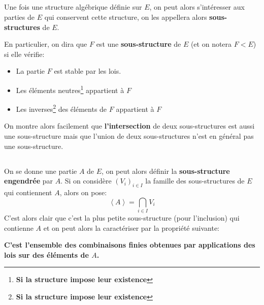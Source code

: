 \subsection*{}
Une fois une structure algébrique définie sur \(E\), on peut alors s'intéresser aux parties de \(E\) qui conservent cette structure, on les appellera alors \textbf{sous-structures} de \(E\).\<

En particulier, on dira que \(F\) est une \textbf{sous-structure} de \(E\) (et on notera \(F < E\)) si elle vérifie:
\begin{itemize}
   \item La partie \(F\) est stable par les lois.
   \item Les éléments neutres\footnote[1]{\textbf{Si la structure impose leur existence}} appartient à \(F\) 
   \item Les inverses\footnote[2]{\textbf{Si la structure impose leur existence}} des éléments de \(F\) appartient à \(F\)
\end{itemize}
On montre alors facilement que \textbf{l'intersection} de deux sous-structures est aussi une sous-structure mais que l'union de deux sous-structures n'est en général pas une sous-structure.
\subsection*{}
On se donne une partie \( A \) de \( E \), on peut alors définir la \textbf{sous-structure engendrée} par \( A \). Si on considère \( (V_i)_{i \in I} \) la famille des sous-structures de \( E \) qui contiennent \( A \), alors on pose:
\[ 
   \left\langle A \right\rangle = \bigcap_{i \in I} V_i
\]
C'est alors clair que c'est la plus petite sous-structure (pour l'inclusion) qui contienne \( A \) et on peut alors la caractériser par la propriété suivante:
\begin{center}
   \textbf{C'est l'ensemble des combinaisons finies obtenues par applications des lois sur des éléments de \( A \).}
\end{center}
